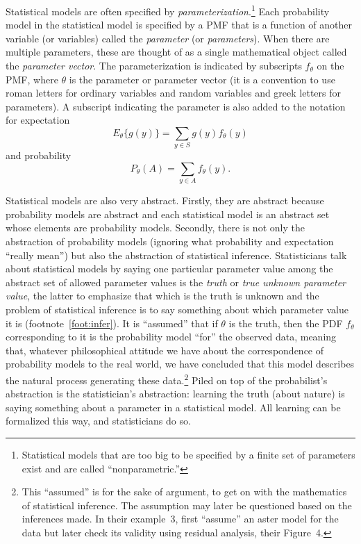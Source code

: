 \documentclass[11pt]{article}
\begin{document}
Statistical models are often specified
by \emph{parameterization}.\footnote{Statistical models that are too big
to be specified by a finite set of parameters exist and are called
``nonparametric.''}  Each probability model in the statistical model is
specified by a PMF that is a function of another variable (or variables)
called the \emph{parameter} (or \emph{parameters}).
When there are multiple parameters, these
are thought of as a single mathematical object called the \emph{parameter
vector}.  The parameterization is indicated by subscripts $f_\theta$ on
the PMF, where $\theta$ is the parameter or parameter vector
(it is a convention to use roman letters for ordinary variables and random
variables and greek letters for parameters).  A subscript indicating the
parameter is also added to the notation for expectation
\begin{equation} \label{eq:discrete-expectations-parmeter}
   E_\theta\{g(y)\} = \sum_{y \in S} g(y) f_\theta(y)
\end{equation}
and probability
\begin{equation} \label{eq:discrete-probabilities-parameter}
   P_\theta(A) = \sum_{y \in A} f_\theta(y).
\end{equation}

Statistical models are also very abstract.  Firstly, they are abstract
because probability models are abstract and each statistical model is
an abstract set whose elements are probability models.  Secondly, there
is not only the abstraction of probability models (ignoring what probability
and expectation ``really mean'') but also the abstraction of statistical
inference.  Statisticians talk about statistical models by saying one
particular parameter value among the abstract set of allowed parameter values
is the \emph{truth} or \emph{true unknown parameter value}, the latter to
emphasize that which is the truth is unknown and the problem of statistical
inference is to say something about which parameter value
it is (footnote~\ref{foot:infer}).  It is ``assumed'' that
if $\theta$ is the truth, then the PDF $f_\theta$ corresponding to it
is the probability model ``for'' the observed data, meaning that, whatever
philosophical attitude we have about the correspondence of probability models
to the real world, we have concluded that this model describes the natural
process generating these data.\footnote{This ``assumed'' is for the sake of
argument, to get on with the mathematics of statistical inference.  The
assumption may later be questioned based on the inferences made.  In their
example~3, \citet{aster2} first ``assume'' an aster model for the data but
later check its validity using residual analysis, their Figure~4.}
Piled on top of the probabilist's abstraction
is the statistician's abstraction: learning the truth (about nature) is
saying something about a parameter in a statistical model.  All learning
can be formalized this way, and statisticians do so.
\end{document}
